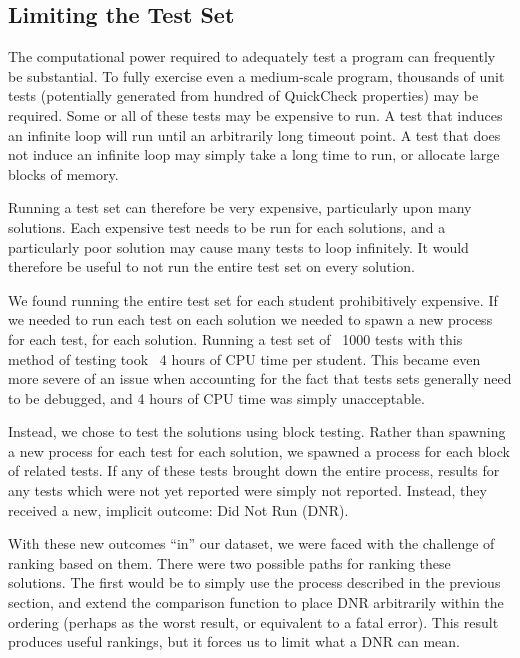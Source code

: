 \documentclass[11pt,twoside]{article}
\begin{document}
\subsection{Limiting the Test Set}

The computational power required to adequately test a program can frequently be substantial. To fully exercise even a medium-scale program, thousands of unit tests (potentially generated from hundred of QuickCheck properties) may be required. Some or all of these tests may be expensive to run. A test that induces an infinite loop will run until an arbitrarily long timeout point. A test that does not induce an infinite loop may simply take a long time to run, or allocate large blocks of memory.

Running a test set can therefore be very expensive, particularly upon many solutions. Each expensive test needs to be run for each solutions, and a particularly poor solution may cause many tests to loop infinitely. It would therefore be useful to not run the entire test set on every solution. 

We found running the entire test set for each student prohibitively expensive. If we needed to run each test on each solution we needed to spawn a new process for each test, for each solution. Running a test set of ~1000 tests with this method of testing took ~4 hours of CPU time per student. This became even more severe of an issue when accounting for the fact that tests sets generally need to be debugged, and 4 hours of CPU time was simply unacceptable.

Instead, we chose to test the solutions using block testing. Rather than spawning a new process for each test for each solution, we spawned a process for each block of related tests. If any of these tests brought down the entire process, results for any tests which were not yet reported were simply not reported. Instead, they received a new, implicit outcome: Did Not Run (DNR).

With these new outcomes ``in'' our dataset, we were faced with the challenge of ranking based on them. There were two possible paths for ranking these solutions. The first would be to simply use the process described in the previous section, and extend the comparison function to place DNR arbitrarily within the ordering (perhaps as the worst result, or equivalent to a fatal error). This result produces useful rankings, but it forces us to limit what a DNR can mean.
\end{document}
